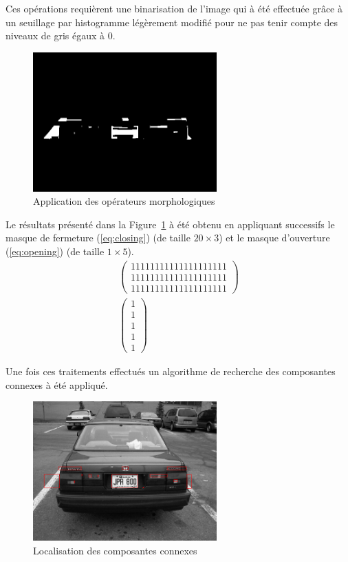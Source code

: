 \documentclass[a4paper,10pt,twocolumn]{article}
\begin{document}
Ces opérations requièrent une binarisation de l'image qui à été effectuée grâce à un seuillage par histogramme légèrement modifié pour ne pas tenir compte des niveaux de gris égaux à 0.
\begin{figure}[H]
	\centering 
	  \includegraphics[width=200pt]{img/991213-006_morpho.png}
	\caption{Application des opérateurs morphologiques\label{morpho}}
\end{figure}
Le résultats présenté dans la Figure~\ref{morpho} à été obtenu en appliquant successifs le masque de fermeture (\ref{eq:closing}) (de taille $20 \times 3$) et le masque d'ouverture (\ref{eq:opening}) (de taille $1 \times 5$).
\begin{gather}
  \label{eq:closing}
  \left( \begin{array}{c} 
    1 1 1 1 1 1 1 1 1 1 1 1 1 1 1 1 1 1 1 1\\
    1 1 1 1 1 1 1 1 1 1 1 1 1 1 1 1 1 1 1 1\\
    1 1 1 1 1 1 1 1 1 1 1 1 1 1 1 1 1 1 1 1    
  \end{array} \right)\\
  \label{eq:opening}
  \left( \begin{array}{c} 
    1\\
    1\\
    1\\
    1\\
    1   
  \end{array} \right)
\end{gather}

Une fois ces traitements effectués un algorithme de recherche des composantes connexes à été appliqué.
\begin{figure}[H]
	\centering 
	  \includegraphics[width=200pt]{img/991213-006_detect_1.png}
	\caption{Localisation des composantes connexes\label{connexes}}
\end{figure}
\end{document}
